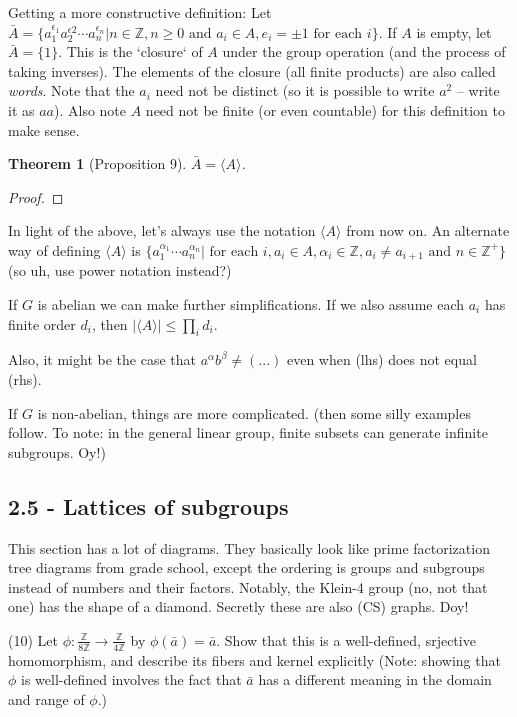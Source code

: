 \documentclass[1    0pt, answers]{exam} \renewcommand{\baselinestretch}{1.05}
\theoremstyle{plain}
\newtheorem{theorem}{Theorem}
\theoremstyle{definition}
\begin{document}
\begin{questions}
Getting a more constructive definition: Let $\bar{A} = \{ a_1^{\epsilon_1} a_2^{\epsilon2} \cdots a_n^{\epsilon_n} | n \in \mathbb{Z}, n \geq 0 \text{ and } a_i \in A, e_i = \pm 1 \text{ for each } i \}$. If $A$ is empty, let $\bar{A} = \{1\}$. This is the `closure` of $A$ under the group operation (and the process of taking inverses). The elements of the closure (all finite products) are also called \emph{words}. Note that the $a_i$ need not be distinct (so it is possible to write $a^2$ -- write it as $aa$). Also note $A$ need not be finite (or even countable) for this definition to make sense.

\begin{theorem}[Proposition 9]
$\bar{A} = \langle A \rangle$.
\end{theorem}
\begin{proof}
\end{proof}

In light of the above, let's always use the notation $\langle A \rangle$ from now on. An alternate way of defining $\langle A \rangle$ is $\{ a_1^{\alpha_1} \cdots a_n^{\alpha_n} | \text{ for each } i, a_i \in A, \alpha_i \in \mathbb{Z}, a_i \neq a_{i + 1} \text{ and } n \in \mathbb{Z}^{+} \}$ (so uh, use power notation instead?)

If $G$ is abelian we can make further simplifications. 
If we also assume each $a_i$ has finite order $d_i$, then $| \langle A \rangle | \leq \prod_{i} d_i$.

Also, it might be the case that $a^{\alpha} b^{\beta} \neq (...)$ even when (lhs) does not equal (rhs).

If $G$ is non-abelian, things are more complicated. (then some silly examples follow. To note: in the general linear group, finite subsets can generate infinite subgroups. Oy!)

\subsection{2.5 - Lattices of subgroups}
This section has a lot of diagrams. They basically look like prime factorization tree diagrams from grade school, except the ordering is groups and subgroups instead of numbers and their factors.
Notably, the Klein-4 group (no, not that one) has the shape of a diamond.
Secretly these are also (CS) graphs. Doy!

\question (10) Let $\phi : \frac{\mathbb{Z}}{8 \mathbb{Z}} \to \frac{\mathbb{Z}}{4 \mathbb{Z}}$ by $\phi(\bar{a}) = \bar{a}$. Show that this is a well-defined, srjective homomorphism, and describe its fibers and kernel explicitly (Note: showing that $\phi$ is well-defined involves the fact that $\bar{a}$ has a different meaning in the domain and range of $\phi$.)


\end{questions}
\end{document}
